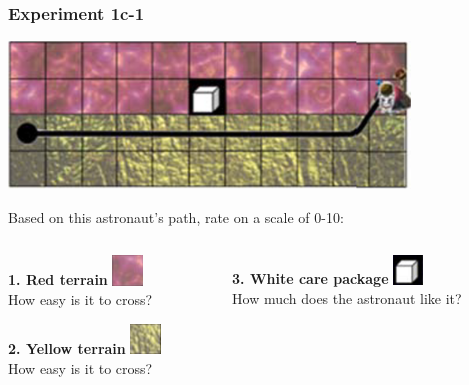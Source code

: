 \documentclass{beamer}
\begin{document}
\begin{frame}
\frametitle{Experiment 1c-1}
\begin{center}
\includegraphics[width=0.8\textwidth]{experiment_1c-1.png}
\end{center}
\vspace{0.3cm}
Based on this astronaut's path, rate on a scale of 0-10:
\begin{columns}
\begin{column}{0.5\textwidth}
\textbf{1. Red terrain} \includegraphics[width=0.8cm]{red_terrain.png}\\
How easy is it to cross?
\vspace{0.3cm}

\textbf{2. Yellow terrain} \includegraphics[width=0.8cm]{yellow_terrain.png}\\
How easy is it to cross?
\end{column}
\begin{column}{0.5\textwidth}
\textbf{3. White care package} \includegraphics[width=0.8cm]{white_carepackage.png}\\
How much does the astronaut like it?
\vspace{0.3cm}
\end{column}
\end{columns}
\end{frame}
\end{document}
